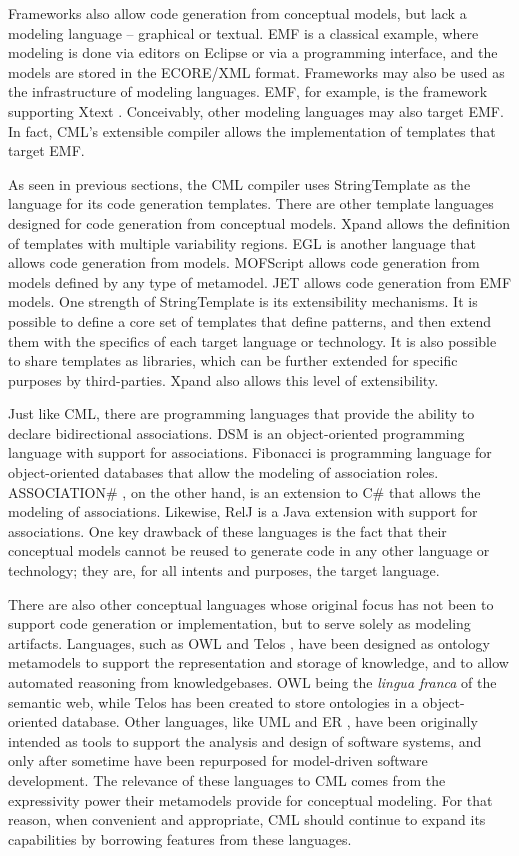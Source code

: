 Frameworks also allow code generation from conceptual models, but lack a modeling language -- graphical or textual.
EMF \cite{emf} is a classical example,
where modeling is done via editors on Eclipse or via a programming interface,
and the models are stored in the ECORE/XML format.
Frameworks may also be used as the infrastructure of modeling languages.
EMF, for example, is the framework supporting Xtext \cite{xtext}.
Conceivably, other modeling languages may also target EMF.
In fact, CML's extensible compiler allows the implementation of templates that target EMF.

As seen in previous sections,
the CML compiler uses StringTemplate \cite{st} as the language for its code generation templates.
There are other template languages designed for code generation from conceptual models.
Xpand \cite{xpand} allows the definition of templates with multiple variability regions.
EGL \cite{egl} is another language that allows code generation from models.
MOFScript \cite{mofscript} allows code generation from models defined
by any type of metamodel.
JET \cite{jet} allows code generation from EMF \cite{emf} models.
One strength of StringTemplate is its extensibility mechanisms.
It is possible to define a core set of templates that define patterns,
and then extend them with the specifics of each target language or technology.
It is also possible to share templates as libraries,
which can be further extended for specific purposes by third-parties.
Xpand also allows this level of extensibility.

Just like CML, there are programming languages
that provide the ability to declare bidirectional associations.
DSM \cite{balzer} is an object-oriented programming language with support for associations.
Fibonacci \cite{fibonacci}  is programming language for object-oriented databases
that allow the modeling of association roles.
ASSOCIATION\# \cite{cardoso}, on the other hand,
is an extension to C\# that allows the modeling of associations.
Likewise, RelJ \cite{bierman} is a Java extension with support for associations.
One key drawback of these languages is the fact that their conceptual models
cannot be reused to generate code in any other language or technology;
they are, for all intents and purposes, the target language.

There are also other conceptual languages
whose original focus has not been to support code generation or implementation,
but to serve solely as modeling artifacts.
Languages, such as OWL \cite{owl2} and Telos \cite{telos},
have been designed as ontology metamodels
to support the representation and storage of knowledge,
and to allow automated reasoning from knowledgebases.
OWL being the \emph{lingua franca} of the semantic web,
while Telos has been created to store ontologies in a object-oriented database.
Other languages, like UML \cite{uml} and ER \cite{er},
have been originally intended as tools to support the analysis and design of software systems,
and only after sometime have been repurposed for model-driven software development.
The relevance of these languages to CML comes from the expressivity power
their metamodels provide for conceptual modeling.
For that reason,
when convenient and appropriate,
CML should continue to expand its capabilities
by borrowing features from these languages.

